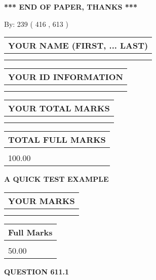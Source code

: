\documentclass[12pt]{article}
\begin{document}
\vspace{1.0in} 
{\textbf{\large{ *** END OF PAPER, THANKS *** }}} 
   
   
\hspace{1.0in} By: 
 239 ( 416 ,  613 )
   
   
   
   
\newpage 
\setcounter{page}{ 
   611001 } 
   
   
   
   
\noindent\begin{tabular}{|l|}
\hline
YOUR NAME (FIRST, ... LAST)  \\
\hline
 \\ 
 \\ 
\hline
\end{tabular}
\hspace{0.05in} \begin{tabular}{|l|}
\hline
 YOUR   ID   INFORMATION  \\
\hline
 \\ 
 \\ 
\hline
\end{tabular}
   
   
\vspace{0.2in}\noindent\begin{tabular}{|l|}
\hline
YOUR TOTAL MARKS  \\
\hline
 \\ 
 \\ 
\hline
\end{tabular}
\hspace{0.05in} \begin{tabular}{|l|}
\hline
TOTAL FULL MARKS  \\
\hline
 \\ 
100.00 \\
\hline
\end{tabular}
   
   
 \vspace{0.2in}
{\LARGE {\textbf{ A QUICK TEST EXAMPLE}}}
   
   
  
\vspace{0.2in}
  
\noindent\begin{tabular}{|l|}
\hline
 YOUR MARKS  \\
\hline
 \\ 
 \\ 
\hline
\end{tabular}
\hspace{0.05in} \begin{tabular}{|l|}
\hline
 Full Marks  \\
\hline
 \\ 
50.00 \\
\hline
\end{tabular}
{\textbf{\Large{QUESTION
611.1 
}}}
  
\end{document}
